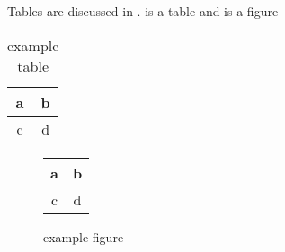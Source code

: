 Tables are discussed in .  is a table and  is a figure 

\begin{table}
 \begin{tabular}{c|c}
  a & b\\
\midrule
c & d\\
 \end{tabular}
\caption{example table}
\label{tab:example}
\end{table}

\begin{figure}
 \begin{tabular}{c|c}
  a & b\\
\midrule
c & d\\
 \end{tabular}
\caption{example figure}
\label{fig:example}
\end{figure}
